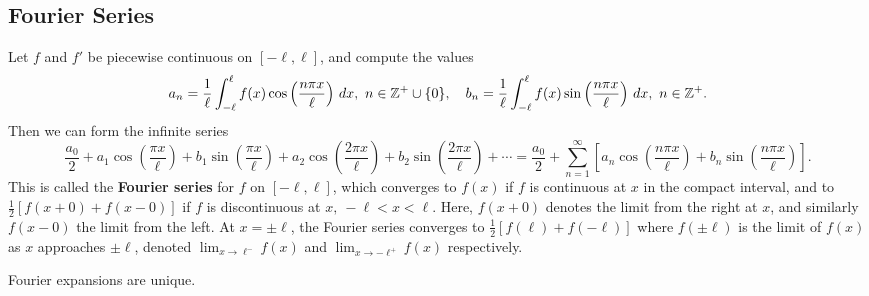 \subsection{Fourier Series}
\begin{theorem}
    Let $f$ and $f'$ be piecewise continuous on $[-\ell,\ell]$, and compute the values \[
        a_n =\frac{1}{\ell}\int_{-\ell}^{\ell} f(x) \cos \left( \frac{n\pi x}{\ell} \right)  \, dx, \ n\in \mathbb{Z}^+ \cup \{0\} , \quad b_n =\frac{1}{\ell}\int_{-\ell}^{\ell}  f(x) \sin \left( \frac{n\pi x}{\ell} \right) \, dx, \ n\in \mathbb{Z}^+.
    \] Then we can form the infinite series \[
    \frac{a_0}{2}+a_1 \cos \left( \frac{\pi x}{\ell} \right) +b_1 \sin\left( \frac{\pi x}{\ell} \right) +a_2 \cos \left( \frac{2\pi x}{\ell} \right) +b_2 \sin \left( \frac{2\pi x}{ \ell} \right) +\cdots = \frac{a_0}{2}+ \sum_{n=1}^{\infty} \left[ a_n \cos \left( \frac{n\pi x}{\ell} \right) + b_n  \sin\left( \frac{n\pi x}{\ell} \right)  \right] .
\] This is called the \textbf{Fourier series} for $f$ on $[-\ell,\ell]$, which converges to $f(x)$ if $f$ is continuous at $x$ in the compact interval, and to $\frac{1}{2}\left[ f(x+0)+f(x-0) \right] $ if $f$ is discontinuous at $x,\ -\ell<x<\ell$. Here, $f(x+0)$ denotes the limit from the right at $x$, and similarly $f(x-0)$ the limit from the left. At $x=\pm \ell$, the Fourier series converges to $\frac{1}{2}\left[ f(\ell)+f(-\ell) \right] $ where $f(\pm \ell)$ is the limit of $f(x)$ as $x$ approaches $ \pm\ell$, denoted $\lim _{x\to \ell^-}f(x)$ and $\lim _{x\to -\ell^+}f(x)$ respectively.
\end{theorem}
\begin{remark}
    Fourier expansions are unique.
\end{remark}

